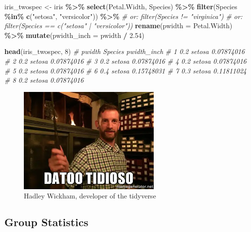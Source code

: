 \documentclass[
]{book}
\newenvironment{Shaded}{\begin{snugshade}}{\end{snugshade}}
\newcommand{\AttributeTok}[1]{\textcolor[rgb]{0.13,0.29,0.53}{#1}}
\newcommand{\CommentTok}[1]{\textcolor[rgb]{0.56,0.35,0.01}{\textit{#1}}}
\newcommand{\DecValTok}[1]{\textcolor[rgb]{0.00,0.00,0.81}{#1}}
\newcommand{\FloatTok}[1]{\textcolor[rgb]{0.00,0.00,0.81}{#1}}
\newcommand{\FunctionTok}[1]{\textcolor[rgb]{0.13,0.29,0.53}{\textbf{#1}}}
\newcommand{\NormalTok}[1]{#1}
\newcommand{\OtherTok}[1]{\textcolor[rgb]{0.56,0.35,0.01}{#1}}
\newcommand{\SpecialCharTok}[1]{\textcolor[rgb]{0.81,0.36,0.00}{\textbf{#1}}}
\newcommand{\StringTok}[1]{\textcolor[rgb]{0.31,0.60,0.02}{#1}}
\begin{document}
\begin{Shaded}
\begin{Highlighting}[]
\NormalTok{iris\_twospec }\OtherTok{\textless{}{-}}\NormalTok{ iris }\SpecialCharTok{\%\textgreater{}\%} 
  \FunctionTok{select}\NormalTok{(Petal.Width, Species) }\SpecialCharTok{\%\textgreater{}\%} 
  \FunctionTok{filter}\NormalTok{(Species }\SpecialCharTok{\%in\%} \FunctionTok{c}\NormalTok{(}\StringTok{"setosa"}\NormalTok{, }\StringTok{"versicolor"}\NormalTok{)) }\SpecialCharTok{\%\textgreater{}\%} 
  \CommentTok{\# or: filter(Species != "virginica")}
  \CommentTok{\# or: filter(Species == c("setosa" | "versicolor"))}
  \FunctionTok{rename}\NormalTok{(}\AttributeTok{pwidth =}\NormalTok{ Petal.Width) }\SpecialCharTok{\%\textgreater{}\%} 
  \FunctionTok{mutate}\NormalTok{(}\AttributeTok{pwidth\_inch =}\NormalTok{ pwidth }\SpecialCharTok{/} \FloatTok{2.54}\NormalTok{)}

\FunctionTok{head}\NormalTok{(iris\_twospec, }\DecValTok{8}\NormalTok{)}
\CommentTok{\#   pwidth Species pwidth\_inch}
\CommentTok{\# 1    0.2  setosa  0.07874016}
\CommentTok{\# 2    0.2  setosa  0.07874016}
\CommentTok{\# 3    0.2  setosa  0.07874016}
\CommentTok{\# 4    0.2  setosa  0.07874016}
\CommentTok{\# 5    0.2  setosa  0.07874016}
\CommentTok{\# 6    0.4  setosa  0.15748031}
\CommentTok{\# 7    0.3  setosa  0.11811024}
\CommentTok{\# 8    0.2  setosa  0.07874016}
\end{Highlighting}
\end{Shaded}

\begin{figure}
\centering
\includegraphics[width=\textwidth,height=2.08333in]{./img/hadley-meme.png}
\caption{Hadley Wickham, developer of the tidyverse}
\end{figure}

\subsection*{Group Statistics}\label{group-statistics}
\end{document}
